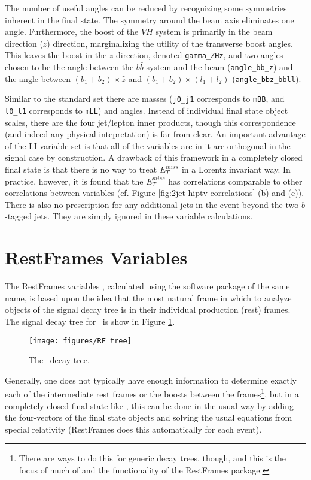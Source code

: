   The number of useful angles can be reduced by recognizing some symmetries inherent in the final state.  The symmetry around the beam axis eliminates one angle.  Furthermore, the boost of the $VH$ system is primarily in the beam direction ($z$) direction, marginalizing the utility of the transverse boost angles.  This leaves the boost in the $z$ direction, denoted \texttt{gamma\_ZHz}, and two angles chosen to be the angle between the $b\bar{b}$ system and the beam (\texttt{angle\_bb\_z}) and the angle between $\left(b_1+b_2\right)\times\hat{z}$ and $\left(b_1+b_2\right)\times\left(l_1+l_2\right)$ (\texttt{angle\_bbz\_bbll}).

Similar to the standard set there are masses (\texttt{j0\_j1} corresponds to \texttt{mBB}, and \texttt{l0\_l1} corresponds to \texttt{mLL}) and angles.  Instead of individual final state object scales, there are the four jet/lepton inner products, though this correspondence (and indeed any physical intepretation) is far from clear.  An important advantage of the LI variable set is that all of the variables are in it are orthogonal in the signal case by construction.  A drawback of this framework in a completely closed final state is that there is no way to treat $E_T^{miss}$ in a Lorentz invariant way.  In practice, however, it is found that the $E_T^{miss}$ has correlations comparable to other correlations between variables (cf. Figure \ref{fig:2jet-hiptv-correlations} (b) and (e)).  There is also no prescription for any additional jets in the event beyond the two $b$-tagged jets.  They are simply ignored in these variable calculations.


\section{RestFrames Variables}
The RestFrames variables \cite{rjr}, calculated using the software package of the same name, is based upon the idea that the most natural frame in which to analyze objects of the signal decay tree is in their individual production (rest) frames.  The signal decay tree for \ZH\, is show in Figure \ref{fig:rftree}.
\begin{figure}[!htbp]\captionsetup{justification=centering}
  \centering
  \texttt{[image: figures/RF\_tree]}
  \caption{The \ZH\, decay tree.}
  \label{fig:rftree}
\end{figure}
Generally, one does not typically have enough information to determine exactly each of the intermediate rest frames or the boosts between the frames\footnote{There are ways to do this for generic decay trees, though, and this is the focus of much of \cite{rjr} and the functionality of the RestFrames package.}, but in a completely closed final state like \ZH, this can be done in the usual way by adding the four-vectors of the final state objects and solving the usual equations from special relativity (RestFrames does this automatically for each event).

